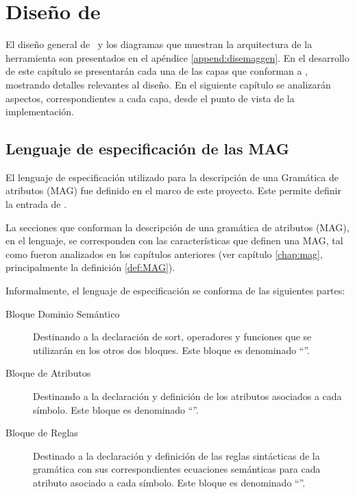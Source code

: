 \chapter{Diseño de \maggen}
\label{chap:disen_}
\minitoc

El diseño general de \maggen\ y los diagramas que muestran la arquitectura de la herramienta son presentados en el apéndice \ref{append:disemaggen}. En el desarrollo de este capítulo se presentarán cada una de las capas que conforman a \maggen, mostrando detalles relevantes al diseño. En el siguiente capítulo se analizarán aspectos, correspondientes a cada capa, desde el punto de vista de la implementación.
 
\section{Lenguaje de especificación de las MAG}
\label{sec:lenguajeMAG}

El lenguaje de especificación utilizado para la descripción de una Gramática de atributos (MAG) fue definido en el marco de este proyecto. Este permite definir la entrada de \maggen.
 
La secciones que conforman la descripción de una gramática de atributos (MAG), en el lenguaje, se corresponden con las características que definen una MAG, tal como fueron analizados en los capítulos anteriores (ver capítulo \ref{chap:mag}, principalmente la definición \ref{def:MAG}).
 
Informalmente, el lenguaje de especificación se conforma de las siguientes partes:

\begin{description}
\item [Bloque Dominio Semántico] Destinando a la declaración de sort, operadores y funciones que se utilizarán en los otros dos bloques. Este bloque es denominado ``''.

\item [Bloque de Atributos] Destinando a la declaración y definición de los atributos asociados a cada símbolo. Este bloque es denominado ``''.

\item [Bloque de Reglas] Destinado a la declaración y definición de las reglas sintácticas de la gramática con sus correspondientes ecuaciones semánticas para cada atributo asociado a cada símbolo. Este bloque es denominado ``''.
\end{description}

